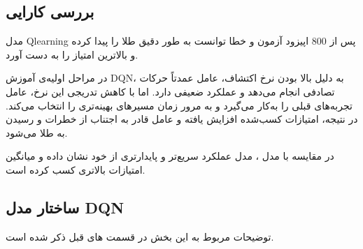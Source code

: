 \documentclass{article}
\begin{document}
\subsection{بررسی کارایی}
مدل Qlearning پس از 800 اپیزود آزمون و خطا توانست به طور دقیق طلا را پیدا کرده و بالاترین امتیاز را به دست آورد. 

در مراحل اولیه‌ی آموزش DQN، به دلیل بالا بودن نرخ اکتشاف، عامل عمدتاً حرکات تصادفی انجام می‌دهد و عملکرد ضعیفی دارد. اما با کاهش تدریجی این نرخ، عامل تجربه‌های قبلی را به‌کار می‌گیرد و به مرور زمان مسیرهای بهینه‌تری را انتخاب می‌کند. در نتیجه، امتیازات کسب‌شده افزایش یافته و عامل قادر به اجتناب از خطرات و رسیدن به طلا می‌شود.

در مقایسه با مدل ، مدل  عملکرد سریع‌تر و پایدارتری از خود نشان داده و میانگین امتیازات بالاتری کسب کرده است.


\subsection{ساختار مدل DQN}
توضیحات مربوط به این بخش در قسمت های قبل ذکر شده است.


 
\end{document}

